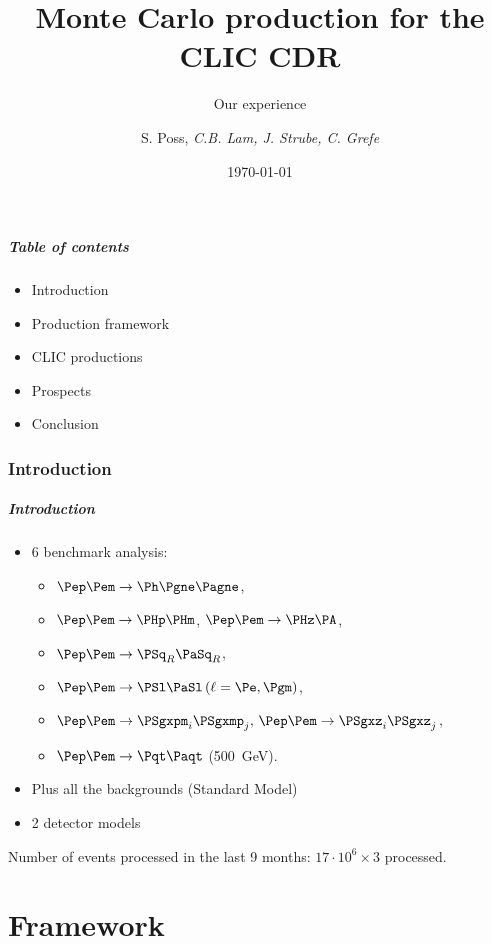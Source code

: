 \documentclass{beamer}
\author{S. Poss, \emph{C.B. Lam, J. Strube, C. Grefe}}
\institute[CERN]{CERN}
\title[]{Monte Carlo production for the CLIC CDR}
\subtitle{Our experience}
\date{\today}
\begin{document}
\begin{frame}
	\titlepage
\end{frame}

\begin{frame}
	\frametitle{Table of contents}
	\begin{itemize}
\item Introduction
\item Production framework
\item CLIC productions
\item Prospects
\item Conclusion
\end{itemize}
\end{frame}

\section{Introduction}

\begin{frame}
	\frametitle{Introduction}
\begin{itemize}
\item 6 benchmark analysis: 
\begin{itemize}
\item $\Pep\Pem \to \Ph \Pgne \Pagne$,
\item  $\Pep\Pem \to \PHp \PHm$, $\Pep\Pem \to \PHz \PA$, 
\item $\Pep\Pem \to \PSq_R \PaSq_R$, 
\item $\Pep\Pem \to \PSl \PaSl \,(\ell = \Pe,\Pgm)$, 
\item $\Pep\Pem \to \PSgxpm_i \PSgxmp_j,\, \Pep\Pem \to \PSgxz_i \PSgxz_j$,
\item  $\Pep\Pem \to \Pqt \Paqt$ (500~GeV).
\end{itemize}
\item Plus all the backgrounds (Standard Model)
\item 2 detector models
\end{itemize}
Number of events processed in the last 9 months: $17\cdot 10^6 \times 3$ processed.
\end{frame}

\part{Framework}
\begin{frame}
\partpage 
\end{frame}
\end{document}
